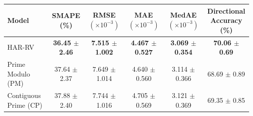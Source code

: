 \begin{tabular}{@{}lccccc@{}}
\toprule
Model & SMAPE (\%) & \shortstack{RMSE\\$(\times 10^{-3})$} & \shortstack{MAE\\$(\times 10^{-3})$} & \shortstack{MedAE\\$(\times 10^{-3})$} & \shortstack{Directional\\Accuracy (\%)} \\
\midrule
HAR-RV & \textbf{36.45 $\pm$ 2.46} & \textbf{7.515 $\pm$ 1.002} & \textbf{4.467 $\pm$ 0.527} & \textbf{3.069 $\pm$ 0.354} & \textbf{70.06 $\pm$ 0.69} \\
Prime Modulo (PM) & 37.64 $\pm$ 2.37 & 7.649 $\pm$ 1.014 & 4.640 $\pm$ 0.560 & 3.114 $\pm$ 0.366 & 68.69 $\pm$ 0.89 \\
Contiguous Prime (CP) & 37.88 $\pm$ 2.40 & 7.744 $\pm$ 1.016 & 4.705 $\pm$ 0.569 & 3.121 $\pm$ 0.369 & 69.35 $\pm$ 0.85 \\
\bottomrule
\end{tabular}
